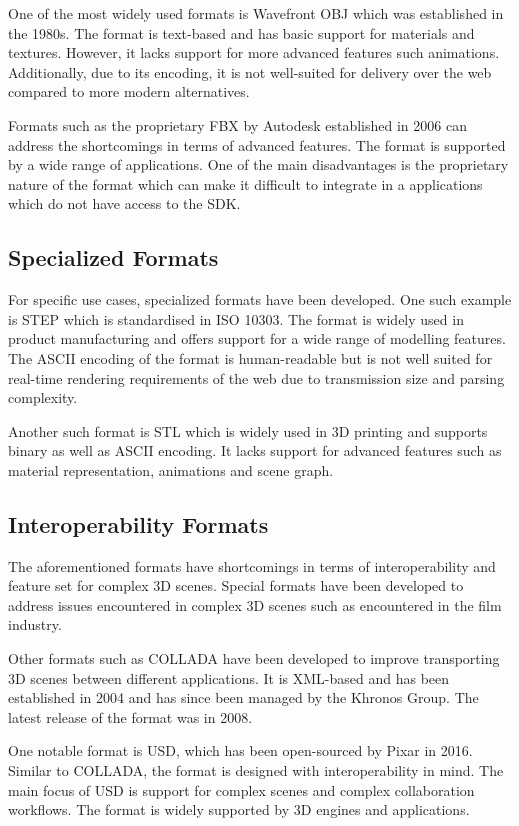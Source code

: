 One of the most widely used formats is Wavefront OBJ which was established in the 1980s. The format is text-based and has basic support for materials and textures. However, it lacks support for more advanced features such animations. Additionally, due to its encoding, it is not well-suited for delivery over the web compared to more modern alternatives.

Formats such as the proprietary FBX by Autodesk established in 2006 can address the shortcomings in terms of advanced features. The format is supported by a wide range of applications. One of the main disadvantages is the proprietary nature of the format  which can make it difficult to integrate in a applications which do not have access to the SDK.

\subsection{Specialized Formats}

For specific use cases, specialized formats have been developed. One such example is STEP which is standardised in ISO 10303. The format is widely used in product manufacturing and offers support for a wide range of modelling features. The ASCII encoding of the format is human-readable but is not well suited for real-time rendering requirements of the web due to transmission size and parsing complexity.

Another such format is STL which is widely used in 3D printing and supports binary as well as ASCII encoding. It lacks support for advanced features such as material representation, animations and scene graph.

\subsection{Interoperability Formats}

The aforementioned formats have shortcomings in terms of interoperability and feature set for complex 3D scenes. Special formats have been developed to address issues encountered in complex 3D scenes such as encountered in the film industry.

Other formats such as COLLADA have been developed to improve transporting 3D scenes between different applications. It is XML-based and has been established in 2004 and has since been managed by the Khronos Group. The latest release of the format was in 2008.

One notable format is USD, which has been open-sourced by Pixar in 2016. Similar to COLLADA, the format is designed with interoperability in mind. The main focus of USD is support for complex scenes and complex collaboration workflows. The format is widely supported by 3D engines and applications.

